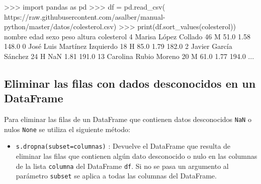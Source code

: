 \documentclass[
  spanish,
  a4paper,
]{scrreport}
\newenvironment{Shaded}{\begin{snugshade}}{\end{snugshade}}
\newcommand{\BuiltInTok}[1]{\textcolor[rgb]{0.00,0.23,0.31}{#1}}
\newcommand{\DecValTok}[1]{\textcolor[rgb]{0.68,0.00,0.00}{#1}}
\newcommand{\FloatTok}[1]{\textcolor[rgb]{0.68,0.00,0.00}{#1}}
\newcommand{\ImportTok}[1]{\textcolor[rgb]{0.00,0.46,0.62}{#1}}
\newcommand{\NormalTok}[1]{\textcolor[rgb]{0.00,0.23,0.31}{#1}}
\newcommand{\OperatorTok}[1]{\textcolor[rgb]{0.37,0.37,0.37}{#1}}
\newcommand{\StringTok}[1]{\textcolor[rgb]{0.13,0.47,0.30}{#1}}
\providecommand{\tightlist}{%
  \setlength{\itemsep}{0pt}\setlength{\parskip}{0pt}}
\begin{document}
\begin{Shaded}
\begin{Highlighting}[]
\OperatorTok{\textgreater{}\textgreater{}\textgreater{}} \ImportTok{import}\NormalTok{ pandas }\ImportTok{as}\NormalTok{ pd}
\OperatorTok{\textgreater{}\textgreater{}\textgreater{}}\NormalTok{ df }\OperatorTok{=}\NormalTok{ pd.read\_csv(}
\StringTok{\textquotesingle{}https://raw.githubusercontent.com/asalber/manual{-}python/master/datos/colesterol.csv\textquotesingle{}}\NormalTok{)}
\OperatorTok{\textgreater{}\textgreater{}\textgreater{}} \BuiltInTok{print}\NormalTok{(df.sort\_values(}\StringTok{\textquotesingle{}colesterol\textquotesingle{}}\NormalTok{))}
\NormalTok{                              nombre  edad sexo   peso  altura  colesterol}
\DecValTok{4}\NormalTok{               Marisa López Collado    }\DecValTok{46}\NormalTok{    M   }\FloatTok{51.0}    \FloatTok{1.58}       \FloatTok{148.0}
\DecValTok{0}\NormalTok{       José Luis Martínez Izquierdo    }\DecValTok{18}\NormalTok{    H   }\FloatTok{85.0}    \FloatTok{1.79}       \FloatTok{182.0}
\DecValTok{2}\NormalTok{              Javier García Sánchez    }\DecValTok{24}\NormalTok{    H    NaN    }\FloatTok{1.81}       \FloatTok{191.0}
\DecValTok{13}\NormalTok{             Carolina Rubio Moreno    }\DecValTok{20}\NormalTok{    M   }\FloatTok{61.0}    \FloatTok{1.77}       \FloatTok{194.0}
\NormalTok{...}
\end{Highlighting}
\end{Shaded}

\subsection{Eliminar las filas con dados desconocidos en un
DataFrame}\label{eliminar-las-filas-con-dados-desconocidos-en-un-dataframe}

Para eliminar las filas de un DataFrame que contienen datos desconocidos
\texttt{NaN} o nulos \texttt{None} se utiliza el siguiente método:

\begin{itemize}
\tightlist
\item
  \texttt{s.dropna(subset=columnas)} : Devuelve el DataFrame que resulta
  de eliminar las filas que contienen algún dato desconocido o nulo en
  las columnas de la lista \texttt{columna} del DataFrame \texttt{df}.
  Si no se pasa un argumento al parámetro \texttt{subset} se aplica a
  todas las columnas del DataFrame.
\end{itemize}
\end{document}
